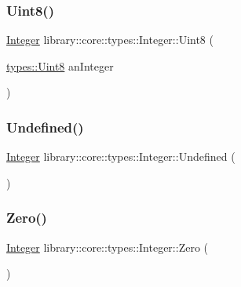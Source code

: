 \subsubsection{\texorpdfstring{Uint8()}{Uint8()}}
{\footnotesize\ttfamily \hyperlink{classlibrary_1_1core_1_1types_1_1_integer}{Integer} library\+::core\+::types\+::\+Integer\+::\+Uint8 (\begin{DoxyParamCaption}\item[{\hyperlink{namespacelibrary_1_1core_1_1types_a2fb690dd0eb982f92a642dbd0c985662}{types\+::\+Uint8}}]{an\+Integer }\end{DoxyParamCaption})\hspace{0.3cm}{\ttfamily [static]}}

\mbox{\label{classlibrary_1_1core_1_1types_1_1_integer_a142c2df49031b787daf30673c73fcad7}} 
\subsubsection{\texorpdfstring{Undefined()}{Undefined()}}
{\footnotesize\ttfamily \hyperlink{classlibrary_1_1core_1_1types_1_1_integer}{Integer} library\+::core\+::types\+::\+Integer\+::\+Undefined (\begin{DoxyParamCaption}{ }\end{DoxyParamCaption})\hspace{0.3cm}{\ttfamily [static]}}

\mbox{\label{classlibrary_1_1core_1_1types_1_1_integer_a908c9b717859421a99d6d8c269685211}} 
\subsubsection{\texorpdfstring{Zero()}{Zero()}}
{\footnotesize\ttfamily \hyperlink{classlibrary_1_1core_1_1types_1_1_integer}{Integer} library\+::core\+::types\+::\+Integer\+::\+Zero (\begin{DoxyParamCaption}{ }\end{DoxyParamCaption})\hspace{0.3cm}{\ttfamily [static]}}



